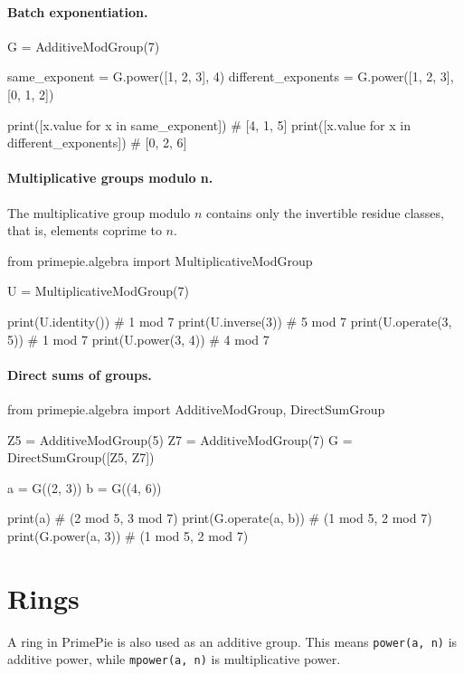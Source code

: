 \paragraph{Batch exponentiation.}
\begin{pybox}
G = AdditiveModGroup(7)

same_exponent = G.power([1, 2, 3], 4)
different_exponents = G.power([1, 2, 3], [0, 1, 2])

print([x.value for x in same_exponent])       # [4, 1, 5]
print([x.value for x in different_exponents]) # [0, 2, 6]
\end{pybox}

\paragraph{Multiplicative groups modulo n.}
The multiplicative group modulo $n$ contains only the invertible residue classes,
that is, elements coprime to $n$.
\begin{pybox}
from primepie.algebra import MultiplicativeModGroup

U = MultiplicativeModGroup(7)

print(U.identity())       # 1 mod 7
print(U.inverse(3))       # 5 mod 7
print(U.operate(3, 5))    # 1 mod 7
print(U.power(3, 4))      # 4 mod 7
\end{pybox}

\paragraph{Direct sums of groups.}
\begin{pybox}
from primepie.algebra import AdditiveModGroup, DirectSumGroup

Z5 = AdditiveModGroup(5)
Z7 = AdditiveModGroup(7)
G = DirectSumGroup([Z5, Z7])

a = G((2, 3))
b = G((4, 6))

print(a)                # (2 mod 5, 3 mod 7)
print(G.operate(a, b))  # (1 mod 5, 2 mod 7)
print(G.power(a, 3))    # (1 mod 5, 2 mod 7)
\end{pybox}

\section{Rings}

A ring in PrimePie is also used as an additive group. This means
\texttt{power(a, n)} is additive power, while \texttt{mpower(a, n)} is
multiplicative power.

